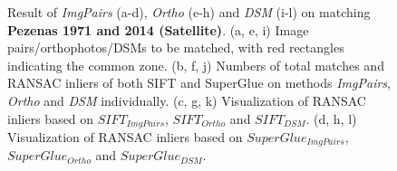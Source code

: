 \begin{figure}[htbp]
\begin{center}
{\begin{minipage}[t]{0.48\linewidth}
			\end{minipage}%
		}
		\caption{{\scriptsize Result of \textit{ImgPairs} (a-d), \textit{Ortho} (e-h) and \textit{DSM} (i-l) on matching \textbf{Pezenas 1971 and 2014 (Satellite)}. (a, e, i) Image pairs/orthophotos/DSMs to be matched, with red rectangles indicating the common zone. (b, f, j) Numbers of total matches and RANSAC inliers of both SIFT and SuperGlue on methods \textit{ImgPairs}, \textit{Ortho} and \textit{DSM} individually. (c, g, k) Visualization of RANSAC inliers based on $SIFT_{ImgPairs}$, $SIFT_{Ortho}$ and $SIFT_{DSM}$. (d, h, l) Visualization of RANSAC inliers based on $SuperGlue_{ImgPairs}$, $SuperGlue_{Ortho}$ and $SuperGlue_{DSM}$.}}        
		\label{MatchVizPezenas-Satellite1971DSM}
	\end{center}
\end{figure} 



